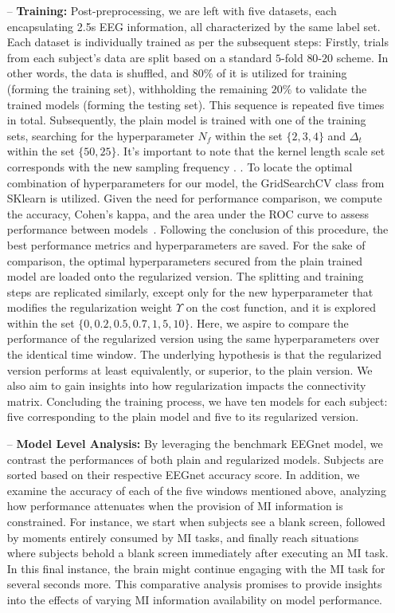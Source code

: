 \begin{itemize}
    \item[--] \textbf{Training:} Post-preprocessing, we are left with five datasets, each encapsulating 2.5s EEG information, all characterized by the same label set. Each dataset is individually trained as per the subsequent steps: Firstly, trials from each subject's data are split based on a standard $5$-fold $80$-$20$ scheme. In other words, the data is shuffled, and $80\%$ of it is utilized for training (forming the training set), withholding the remaining $20\%$ to validate the trained models (forming the testing set). This sequence is repeated five times in total. Subsequently, the plain model is trained with one of the training sets, searching for the hyperparameter $N_f$ within the set $\{2,3,4\}$ and $\Delta_t$ within the set $\{50,25\}$. It's important to note that the kernel length scale set corresponds with the new sampling frequency \cite{lawhern2018eegnet}. . To locate the optimal combination of hyperparameters for our model, the GridSearchCV class from SKlearn is utilized. Given the need for performance comparison, we compute the accuracy, Cohen's kappa, and the area under the ROC curve to assess performance between models~\cite{warrens2015five,geron2022hands}. Following the conclusion of this procedure, the best performance metrics and hyperparameters are saved. For the sake of comparison, the optimal hyperparameters secured from the plain trained model are loaded onto the regularized version. The splitting and training steps are replicated similarly, except only for the new hyperparameter that modifies the regularization weight $\Upsilon$ on the cost function, and it is explored within the set $\{0,0.2,0.5,0.7,1,5,10\}$. Here, we aspire to compare the performance of the regularized version using the same hyperparameters over the identical time window. The underlying hypothesis is that the regularized version performs at least equivalently, or superior, to the plain version. We also aim to gain insights into how regularization impacts the connectivity matrix. Concluding the training process, we have ten models for each subject: five corresponding to the plain model and five to its regularized version.

    \item[--] \textbf{Model Level Analysis:} By leveraging the benchmark EEGnet model, we contrast the performances of both plain and regularized models. Subjects are sorted based on their respective EEGnet accuracy score. In addition, we examine the accuracy of each of the five windows mentioned above, analyzing how performance attenuates when the provision of MI information is constrained. For instance, we start when subjects see a blank screen, followed by moments entirely consumed by MI tasks, and finally reach situations where subjects behold a blank screen immediately after executing an MI task. In this final instance, the brain might continue engaging with the MI task for several seconds more. This comparative analysis promises to provide insights into the effects of varying MI information availability on model performance. 


\end{itemize}
